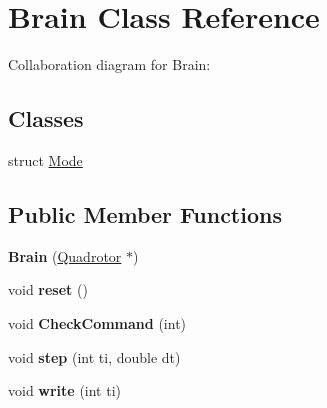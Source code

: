 \hypertarget{classBrain}{
\section{Brain Class Reference}
\label{classBrain}
}
Collaboration diagram for Brain:\subsection*{Classes}
\begin{DoxyCompactItemize}
\item 
struct \hyperlink{structBrain_1_1Mode}{Mode}
\end{DoxyCompactItemize}
\subsection*{Public Member Functions}
\begin{DoxyCompactItemize}
\item 
\hypertarget{classBrain_ad661eb184de49991281a1913d71dbad5}{
{\bfseries Brain} (\hyperlink{classQuadrotor}{Quadrotor} $\ast$)}
\label{classBrain_ad661eb184de49991281a1913d71dbad5}

\item 
\hypertarget{classBrain_ab45d9d639fdf6fa9f7d24e3f4272d35f}{
void {\bfseries reset} ()}
\label{classBrain_ab45d9d639fdf6fa9f7d24e3f4272d35f}

\item 
\hypertarget{classBrain_af0033e0a76b1dbab2935ca93b1008dad}{
void {\bfseries CheckCommand} (int)}
\label{classBrain_af0033e0a76b1dbab2935ca93b1008dad}

\item 
\hypertarget{classBrain_a7f03601463650611a436793da2b80abd}{
void {\bfseries step} (int ti, double dt)}
\label{classBrain_a7f03601463650611a436793da2b80abd}

\item 
\hypertarget{classBrain_a3117d293a1087e00f2ba05cf3099a0ae}{
void {\bfseries write} (int ti)}
\label{classBrain_a3117d293a1087e00f2ba05cf3099a0ae}

\end{DoxyCompactItemize}
